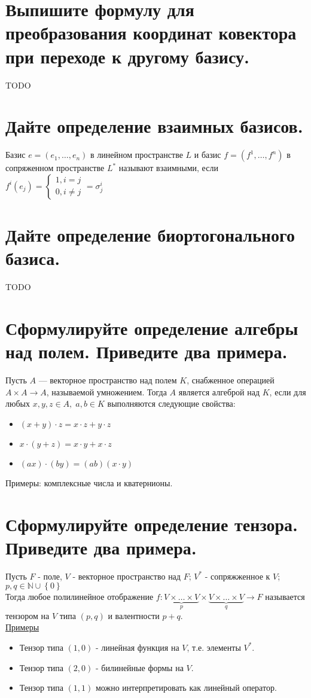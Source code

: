 \documentclass{article}
\newcommand{\N}[0]{
    \mathbb{N}
}
\begin{document}
\section{Выпишите формулу для преобразования координат ковектора при переходе к другому базису.}
TODO

\section{Дайте определение взаимных базисов.}
Базис $e = (e_1, \ldots , e_n)$ в линейном пространстве $L$ и
базис $f = (f^1, \ldots , f^n)$ в сопряженном пространстве $L^*$
называют взаимными, если
$
f^i(e_j) =
\begin{cases}
    1, i = j\\
    0, i \neq j
\end{cases} = \sigma^i_j
$

\section{Дайте определение биортогонального базиса.}
TODO

\section{Сформулируйте определение алгебры над полем. Приведите два примера.}
Пусть $A$ — векторное пространство над полем $K$,
снабженное операцией $A\times A\to A$, называемой умножением. 
Тогда $A$ является алгеброй над $K$, если для любых $x,y,z\in A, \; a,b\in K$
выполняются следующие свойства:
\begin{itemize}
    \item $(x+y)\cdot z=x\cdot z+y\cdot z$
    \item $x\cdot (y+z)=x\cdot y+x\cdot z$
    \item $(ax)\cdot (by)=(ab)(x\cdot y)$
\end{itemize}
Примеры: комплексные числа и кватернионы.    

\section{Сформулируйте определение тензора. Приведите два примера.}
Пусть $F$ - поле, $V$ - векторное пространство над $F$;
$V^*$ - сопряжженное к $V$; 
$p, q \in \N \cup \left\{ 0\right\}$
\\
Тогда любое полилинейное отображение
$f: \underbrace{V \times \ldots \times V}_p \times \underbrace{V \times \ldots \times V}_q \longrightarrow F$
называется тензором на $V$ типа $(p,q)$ и
валентности $p + q$.
\\
\underline{Примеры}
\begin{itemize}
    \item Тензор типа $(1, 0)$ - линейная функция на $V$, т.е. элементы $V^*$.
    \item Тензор типа $(2, 0)$ - билинейные формы на $V$.
    \item Тензор типа $(1, 1)$ можно интерпретировать как линейный оператор.
\end{itemize}
\end{document}
